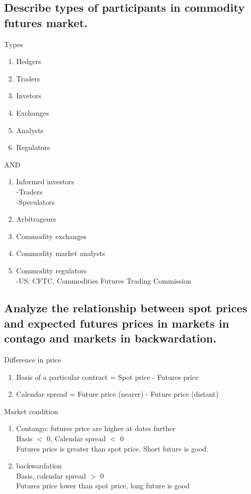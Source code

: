 \documentclass{article}
\newcommand{\be}{\begin{enumerate}}
\newcommand{\ee}{\end{enumerate}}
\begin{document}
\subsection{Describe types of participants in commodity futures market.}
Types
\be
    \item Hedgers
    \item Traders
    \item Invetors
    \item Exchanges
    \item Analysts
    \item Regulators
\ee
AND
\be
    \item Informed investors
        \\-Traders
        \\-Speculators
    \item Arbitrageurs
    \item Commodity exchanges
    \item Commodity market analysts
    \item Commodity regulators
        \\-US: CFTC, Commodities Futures Trading Commission
\ee
\subsection{Analyze the relationship between spot prices and expected futures prices in markets
in contago and markets in backwardation.}
Difference in price
\be
    \item Basis of a particular contract = Spot price - Futures price
    \item Calendar spread = Future price (nearer) - Future price (distant)
\ee
Market condition
\be
    \item Contango: futures price are higher at dates further
        \\ Basis $<$ 0, Calendar spread $<$ 0
        \\ Futures price is greater than spot price. Short future is good.
    \item backwardation
        \\ Basis, calendar spread $>$ 0
        \\ Futures price lower than spot price, long future is good
\ee
\end{document}
